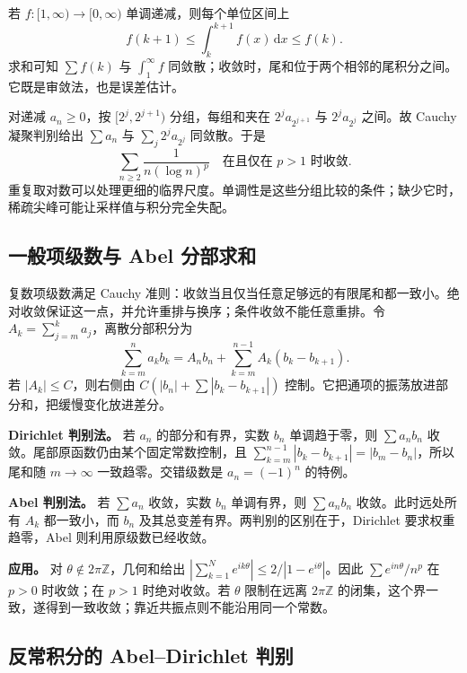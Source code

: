 \documentclass[UTF8,12pt,a4paper,fontset=fandol]{ctexart}
\begin{document}
\label{app:series-integral}

若 $f:[1,\infty)\to[0,\infty)$ 单调递减，则每个单位区间上
\[
f(k+1)\leq\int_k^{k+1}f(x)\,\mathrm dx\leq f(k).
\]
求和可知 $\sum f(k)$ 与 $\int_1^\infty f$ 同敛散；收敛时，尾和位于两个相邻的尾积分之间。它既是审敛法，也是误差估计。

对递减 $a_n\geq0$，按 $[2^j,2^{j+1})$ 分组，每组和夹在 $2^ja_{2^{j+1}}$ 与 $2^ja_{2^j}$ 之间。故 Cauchy 凝聚判别给出 $\sum a_n$ 与 $\sum_j2^ja_{2^j}$ 同敛散。于是
\[
\sum_{n\geq2}\frac1{n(\log n)^p}
\quad\text{在且仅在 }p>1\text{ 时收敛}.
\]
重复取对数可以处理更细的临界尺度。单调性是这些分组比较的条件；缺少它时，稀疏尖峰可能让采样值与积分完全失配。

\subsection{一般项级数与 Abel 分部求和}

\label{app:series-dirichlet}

复数项级数满足 Cauchy 准则：收敛当且仅当任意足够远的有限尾和都一致小。绝对收敛保证这一点，并允许重排与换序；条件收敛不能任意重排。令 $A_k=\sum_{j=m}^ka_j$，离散分部积分为
\[
\sum_{k=m}^na_kb_k=A_nb_n+\sum_{k=m}^{n-1}A_k(b_k-b_{k+1}).
\]
若 $|A_k|\leq C$，则右侧由 $C(|b_n|+\sum|b_k-b_{k+1}|)$ 控制。它把通项的振荡放进部分和，把缓慢变化放进差分。

\textbf{Dirichlet 判别法。} 若 $a_n$ 的部分和有界，实数 $b_n$ 单调趋于零，则 $\sum a_nb_n$ 收敛。尾部原函数仍由某个固定常数控制，且 $\sum_{k=m}^{n-1}|b_k-b_{k+1}|=|b_m-b_n|$，所以尾和随 $m\to\infty$ 一致趋零。交错级数是 $a_n=(-1)^n$ 的特例。

\textbf{Abel 判别法。} 若 $\sum a_n$ 收敛，实数 $b_n$ 单调有界，则 $\sum a_nb_n$ 收敛。此时远处所有 $A_k$ 都一致小，而 $b_n$ 及其总变差有界。两判别的区别在于，Dirichlet 要求权重趋零，Abel 则利用原级数已经收敛。

\textbf{应用。} 对 $\theta\notin2\pi\mathbb Z$，几何和给出 $|\sum_{k=1}^Ne^{ik\theta}|\leq2/|1-e^{i\theta}|$。因此 $\sum e^{in\theta}/n^p$ 在 $p>0$ 时收敛；在 $p>1$ 时绝对收敛。若 $\theta$ 限制在远离 $2\pi\mathbb Z$ 的闭集，这个界一致，遂得到一致收敛；靠近共振点则不能沿用同一个常数。

\subsection{反常积分的 Abel–Dirichlet 判别}

\label{app:series-ad-integral}
\end{document}
